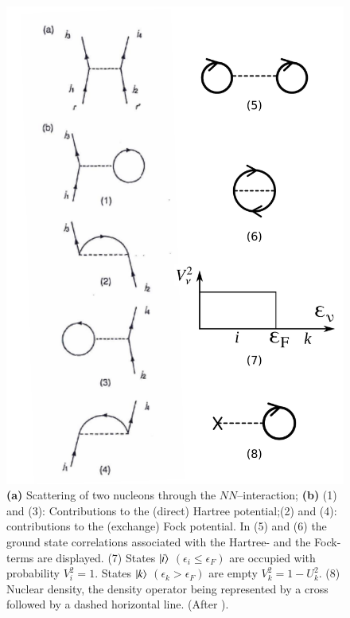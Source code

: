\begin{figure}
	\centerline {
		\includegraphics*[width=12cm]{introduccion/figs/figpreface6}
	}
	\caption{\textbf{(a)} Scattering of two nucleons through the  $NN$--interaction; \textbf{(b)} (1) and (3): Contributions to the (direct) Hartree potential;(2) and (4): contributions to the (exchange) Fock potential. In (5) and (6) the ground state correlations associated with the Hartree- and the Fock-terms are displayed. (7) States $|{i} \rangle$ $(\epsilon_i\leq\epsilon_F)$ are occupied with probability $V^2_i=1$. States $|{k} \rangle$ $(\epsilon_k>\epsilon_F)$ are empty $V^2_k=1-U^2_k$. (8) Nuclear density, the density operator being represented by a cross followed by a dashed horizontal line. (After \cite{Brink:05}).}
	\label{fig1.0.6}
\end{figure}
